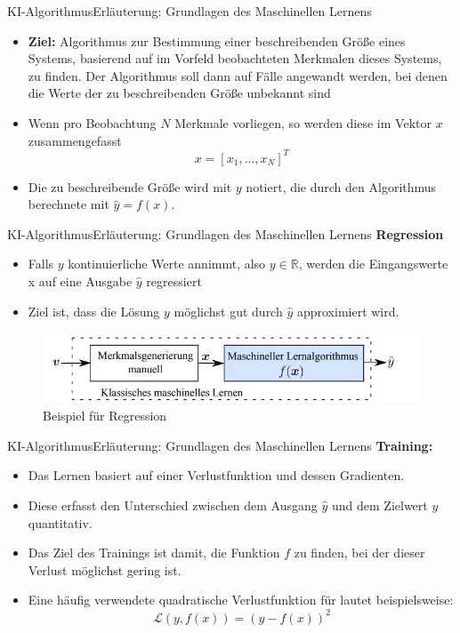 \documentclass[169, handout	]{THIbeamer} %
\begin{document}
	\begin{frame}{KI-Algorithmus}{Erläuterung: Grundlagen des Maschinellen Lernens}
		\begin{itemize}
			\item \textbf{Ziel:} Algorithmus zur Bestimmung einer beschreibenden Größe eines Systems, basierend auf im Vorfeld beobachteten Merkmalen dieses Systems, zu finden. Der Algorithmus soll dann auf Fälle angewandt werden, bei denen die Werte der zu beschreibenden Größe unbekannt sind
			\item Wenn pro Beobachtung $N$ Merkmale vorliegen, so werden diese im Vektor $x$ zusammengefasst
			\begin{equation}
				x = [x_1,..., x_{N}]^{T}
			\end{equation}
			\item Die zu beschreibende Größe wird mit $y$ notiert, die durch den Algorithmus berechnete mit $\hat{y} = f(x)$.
		\end{itemize}	
	\end{frame}
	\begin{frame}{KI-Algorithmus}{Erläuterung: Grundlagen des Maschinellen Lernens}
		\textbf{Regression}	
		\begin{itemize}
			\item Falls $y$ kontinuierliche Werte annimmt, also $y \in \mathbb{R}$, werden die Eingangswerte x auf eine Ausgabe $\hat{y}$ regressiert 
			\item Ziel ist, dass die Lösung $y$ möglichst gut durch $\hat{y}$ approximiert wird.
		\end{itemize}			
		\begin{figure}
			\includegraphics[scale=0.7]{required/Machine Learning.jpg}
			\caption{Beispiel für Regression}
        	\label{Machine Learning}
		\end{figure}
	\end{frame}
	\begin{frame}{KI-Algorithmus}{Erläuterung: Grundlagen des Maschinellen Lernens}
		\textbf{Training: } 		
		\begin{itemize}
			\item Das Lernen basiert auf einer Verlustfunktion und dessen Gradienten. 
			\item Diese erfasst den Unterschied zwischen dem Ausgang $\hat{y}$ und dem Zielwert $y$ quantitativ.
			\item Das Ziel des Trainings ist damit, die Funktion $f$ zu finden, bei der dieser Verlust möglichst gering ist. 
			\item Eine häufig verwendete quadratische Verlustfunktion für lautet beispielsweise:
			\begin{equation}
				\mathcal{L}(y, f(x)) = (y - f(x))^{2}
			\end{equation}
		\end{itemize}				
	\end{frame}
\end{document}
